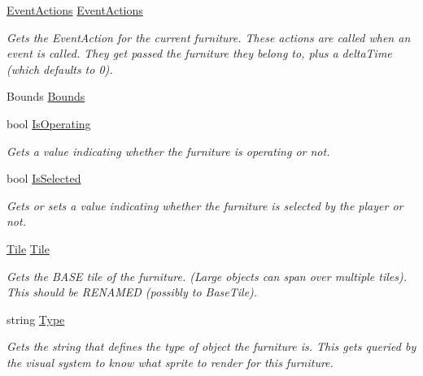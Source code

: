 \begin{DoxyCompactItemize}
\hyperlink{class_event_actions}{Event\+Actions} \hyperlink{class_furniture_a56ff5780eea7e88478de948193cf2191}{Event\+Actions}
\begin{DoxyCompactList}\small\item\em Gets the Event\+Action for the current furniture. These actions are called when an event is called. They get passed the furniture they belong to, plus a delta\+Time (which defaults to 0). \end{DoxyCompactList}\item 
Bounds \hyperlink{class_furniture_a496d1f87bc89564b45ef182166eebc8d}{Bounds}
\item 
bool \hyperlink{class_furniture_addc32913065ddd0ee4660b2de3f84a42}{Is\+Operating}
\begin{DoxyCompactList}\small\item\em Gets a value indicating whether the furniture is operating or not. \end{DoxyCompactList}\item 
bool \hyperlink{class_furniture_a5ae8766d2419a00dfadc9728100ef68e}{Is\+Selected}
\begin{DoxyCompactList}\small\item\em Gets or sets a value indicating whether the furniture is selected by the player or not. \end{DoxyCompactList}\item 
\hyperlink{class_tile}{Tile} \hyperlink{class_furniture_ac22ea3ffa9d94a5df9506fe619fed854}{Tile}
\begin{DoxyCompactList}\small\item\em Gets the B\+A\+SE tile of the furniture. (Large objects can span over multiple tiles). This should be R\+E\+N\+A\+M\+ED (possibly to Base\+Tile). \end{DoxyCompactList}\item 
string \hyperlink{class_furniture_a20ab8b51ecf342cf0463482bf2816de4}{Type}
\begin{DoxyCompactList}\small\item\em Gets the string that defines the type of object the furniture is. This gets queried by the visual system to know what sprite to render for this furniture. \end{DoxyCompactList}\item 

\end{DoxyCompactItemize}
